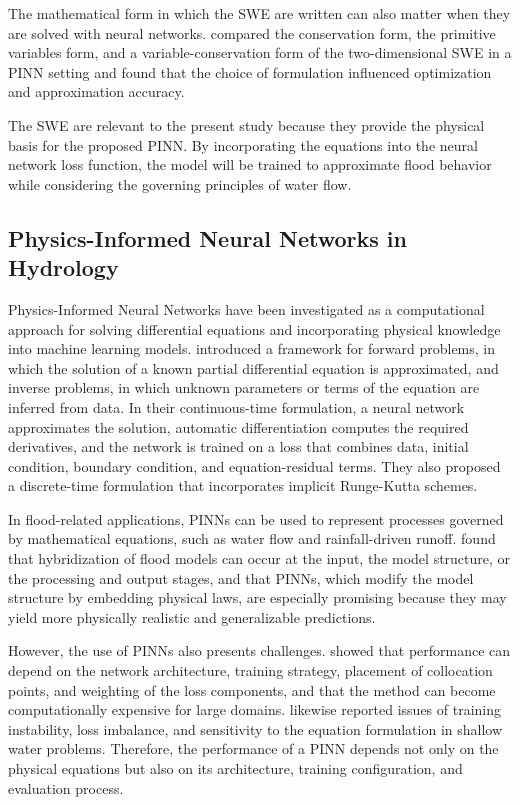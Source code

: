 The mathematical form in which the SWE are written can also matter when they are solved with neural networks.  compared the conservation form, the primitive variables form, and a variable-conservation form of the two-dimensional SWE in a PINN setting and found that the choice of formulation influenced optimization and approximation accuracy.

The SWE are relevant to the present study because they provide the physical basis for the proposed PINN. By incorporating the equations into the neural network loss function, the model will be trained to approximate flood behavior while considering the governing principles of water flow.

\subsection{Physics-Informed Neural Networks in Hydrology}

Physics-Informed Neural Networks have been investigated as a computational approach for solving differential equations and incorporating physical knowledge into machine learning models.  introduced a framework for forward problems, in which the solution of a known partial differential equation is approximated, and inverse problems, in which unknown parameters or terms of the equation are inferred from data. In their continuous-time formulation, a neural network approximates the solution, automatic differentiation computes the required derivatives, and the network is trained on a loss that combines data, initial condition, boundary condition, and equation-residual terms. They also proposed a discrete-time formulation that incorporates implicit Runge-Kutta schemes.

In flood-related applications, PINNs can be used to represent processes governed by mathematical equations, such as water flow and rainfall-driven runoff.  found that hybridization of flood models can occur at the input, the model structure, or the processing and output stages, and that PINNs, which modify the model structure by embedding physical laws, are especially promising because they may yield more physically realistic and generalizable predictions.

However, the use of PINNs also presents challenges.  showed that performance can depend on the network architecture, training strategy, placement of collocation points, and weighting of the loss components, and that the method can become computationally expensive for large domains.  likewise reported issues of training instability, loss imbalance, and sensitivity to the equation formulation in shallow water problems. Therefore, the performance of a PINN depends not only on the physical equations but also on its architecture, training configuration, and evaluation process.

